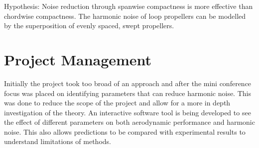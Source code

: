 \documentclass{article}
\begin{document}
Hypothesis:
Noise reduction through spanwise compactness is more effective than chordwise compactness.
The harmonic noise of loop propellers can be modelled by the superposition of evenly spaced, swept propellers.
\section{Project Management}

Initially the project took too broad of an approach and after the mini conference focus was placed on identifying parameters that can reduce harmonic noise.
This was done to reduce the scope of the project and allow for a more in depth investigation of the theory.
An interactive software tool is being developed to see the effect of different parameters on both aerodynamic performance and harmonic noise.
This also allows predictions to be compared with experimental results to understand limitations of methods.
\end{document}
